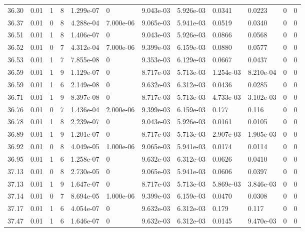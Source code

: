 \documentclass[preview]{standalone}
\begin{document}
{{{{{{{{{{{{{\begin{tabular}{L{1.2cm}C{1.2cm} C{0.3cm}C{0.5cm} C{1.4cm}C{1.4cm} C{1.4cm}C{1.4cm} C{1.6cm}C{1.6cm} C{1.6cm}C{1.6cm}}
  36.30  &  0.01  & 1     &  8 &  1.299e-07  & 0  &  9.043e-03&   5.926e-03& 0.0341 & 0.0223   &  0 & 0  \\ 
  36.37  &  0.01  & 0     &  8 &  4.288e-04  & 7.000e-06  &  9.065e-03&   5.941e-03& 0.0519 & 0.0340   &  0 & 0  \\ 
  36.51  &  0.01  & 1     &  8 &  1.406e-07  & 0  &  9.043e-03&   5.926e-03& 0.0866 & 0.0568   &  0 & 0  \\ 
  36.52  &  0.01  & 0     &  7 &  4.312e-04  & 7.000e-06  &  9.399e-03&   6.159e-03& 0.0880 & 0.0577   &  0 & 0  \\ 
  36.53  &  0.01  & 1     &  7 &  7.855e-08  & 0  &  9.353e-03&   6.129e-03& 0.0667 & 0.0437   &  0 & 0  \\ 
  36.59  &  0.01  & 1     &  9 &  1.129e-07  & 0  &  8.717e-03&   5.713e-03& 1.254e-03 & 8.210e-04   &  0 & 0  \\ 
  36.59  &  0.01  & 1     &  6 &  2.149e-08  & 0  &  9.632e-03&   6.312e-03& 0.0436 & 0.0285   &  0 & 0  \\ 
  36.71  &  0.01  & 1     &  9 &  8.397e-08  & 0  &  8.717e-03&   5.713e-03& 4.733e-03 & 3.102e-03   &  0 & 0  \\ 
  36.76  &  0.01  & 0     &  7 &  1.436e-04  & 2.000e-06  &  9.399e-03&   6.159e-03& 0.177 & 0.116   &  0 & 0  \\ 
  36.78  &  0.01  & 1     &  8 &  2.239e-07  & 0  &  9.043e-03&   5.926e-03& 0.0161 & 0.0105   &  0 & 0  \\ 
  36.89  &  0.01  & 1     &  9 &  1.201e-07  & 0  &  8.717e-03&   5.713e-03& 2.907e-03 & 1.905e-03   &  0 & 0  \\ 
  36.92  &  0.01  & 0     &  8 &  4.049e-05  & 1.000e-06  &  9.065e-03&   5.941e-03& 0.0174 & 0.0114   &  0 & 0  \\ 
  36.95  &  0.01  & 1     &  6 &  1.258e-07  & 0  &  9.632e-03&   6.312e-03& 0.0626 & 0.0410   &  0 & 0  \\ 
  37.13  &  0.01  & 0     &  8 &  2.730e-05  & 0  &  9.065e-03&   5.941e-03& 0.0606 & 0.0397   &  0 & 0  \\ 
  37.13  &  0.01  & 1     &  9 &  1.647e-07  & 0  &  8.717e-03&   5.713e-03& 5.869e-03 & 3.846e-03   &  0 & 0  \\ 
  37.14  &  0.01  & 0     &  7 &  8.694e-05  & 1.000e-06  &  9.399e-03&   6.159e-03& 0.0470 & 0.0308   &  0 & 0  \\ 
  37.17  &  0.01  & 1     &  6 &  4.054e-07  & 0  &  9.632e-03&   6.312e-03& 0.179 & 0.117   &  0 & 0  \\ 
  37.47  &  0.01  & 1     &  6 &  1.646e-07  & 0  &  9.632e-03&   6.312e-03& 0.0145 & 9.470e-03   &  0 & 0  \\ 

\end{tabular}}}}}}}}}}}}}}
\end{document}
